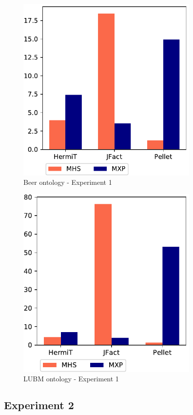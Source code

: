 \documentclass[12pt,a4paper]{article}
\begin{document}
\begin{figure}[H]
	\centering
	\includegraphics[width=9cm]{eval1Beer} 
	\caption{Beer ontology - Experiment 1}
	\label{fig:eval1Beer}
\end{figure}

\begin{figure}[H]
	\centering
	\includegraphics[width=9cm]{eval1LUBM} 
	\caption{LUBM ontology - Experiment 1}
	\label{fig:eval1LUBM}
\end{figure}

\subsection{Experiment 2}
\end{document}
